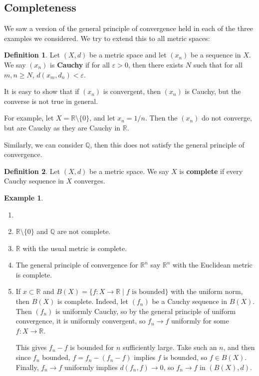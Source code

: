 \documentclass[12pt]{article}
\theoremstyle{definition}
\newtheorem{definition}{Definition}[section]
\newtheorem{example}{Example}[section]
\theoremstyle{remark}
\begin{document}
\subsection{Completeness}%
\label{sub:completeness}

We saw a version of the general principle of convergence held in each of the three examples we considered. We try to extend this to all metric spaces:

\newpage

\begin{definition}
	Let $(X, d)$ be a metric space and let $(x_n)$ be a sequence in $X$. We say $(x_n)$ is \textbf{Cauchy} if for all $\varepsilon > 0$, then there exists $N$ such that for all $m, n \geq N$, $d(x_m, d_n) < \varepsilon$.
\end{definition}

It is easy to show that if $(x_n)$ is convergent, then $(x_n)$ is Cauchy, but the converse is not true in general.

For example, let $X = \mathbb{R} \setminus \{0\}$, and let $x_n = 1/n$. Then the $(x_n)$ do not converge, but are Cauchy as they are Cauchy in $\mathbb{R}$.

Similarly, we can consider $\mathbb{Q}$, then this does not satisfy the general principle of convergence.

\begin{definition}
	Let $(X, d)$ be a metric space. We say $X$ is \textbf{complete} if every Cauchy sequence in $X$ converges.
\end{definition}

\begin{adjustbox}{minipage = \columnwidth - 25.5pt, margin=1em, frame=1pt, margin=0em}
\begin{example}
	\begin{enumerate}[1.]
		\item[]
		\item $\mathbb{R} \setminus \{0\}$ and $\mathbb{Q}$ are not complete.
		\item $\mathbb{R}$ with the usual metric is complete.
		\item The general principle of convergence for $\mathbb{R}^{n}$ say $\mathbb{R}^{n}$ with the Euclidean metric is complete.
		\item If $x \subset \mathbb{R}$ and $B(X) = \{f : X \to \mathbb{R} \mid f \text{ is bounded}\}$ with the uniform norm, then $B(X)$ is complete. Indeed, let $(f_n)$ be a Cauchy sequence in $B(X)$. Then $(f_n)$ is uniformly Cauchy, so by the general principle of uniform convergence, it is uniformly convergent, so $f_n \to f$ uniformly for some $f : X \to \mathbb{R}$.

			This gives $f_n - f$ is bounded for $n$ sufficiently large. Take such an $n$, and then since $f_n$ bounded, $f = f_n - (f_n - f)$ implies $f$ is bounded, so $f \in B(X)$. Finally, $f_n \to f$ uniformly implies $d(f_n, f) \to 0$, so $f_n \to f$ in $(B(X), d)$.
	\end{enumerate}
\end{example}
\end{adjustbox}
\end{document}
